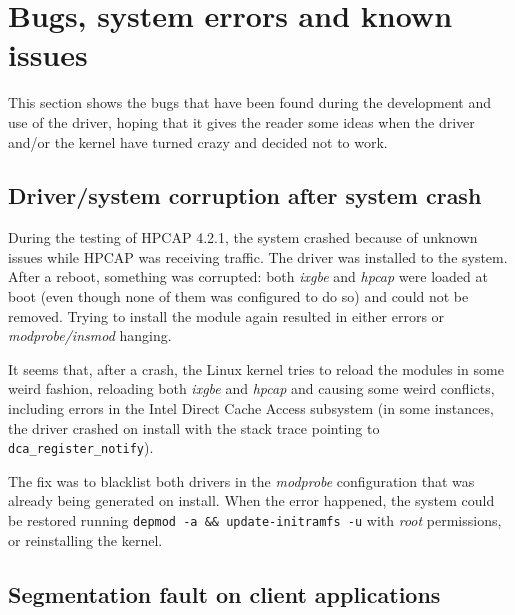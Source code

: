 \section{Bugs, system errors and known issues}
\label{sec:bugs}

This section shows the bugs that have been found during the development and use of the driver, hoping that it gives the reader some ideas when the driver and/or the kernel have turned crazy and decided not to work.

\subsection{Driver/system corruption after system crash}
\label{sec:bugs:drivercorrupt}

\begin{bugdata}
\end{bugdata}

During the testing of HPCAP 4.2.1, the system crashed because of unknown issues while HPCAP was receiving traffic. The driver was installed to the system. After a reboot, something was corrupted: both \textit{ixgbe} and \textit{hpcap} were loaded at boot (even though none of them was configured to do so) and could not be removed. Trying to install the module again resulted in either errors or \textit{modprobe/insmod} hanging.

It seems that, after a crash, the Linux kernel tries to reload the modules in some weird fashion, reloading both \textit{ixgbe} and \textit{hpcap} and causing some weird conflicts, including errors in the Intel Direct Cache Access subsystem (in some instances, the driver crashed on install with the stack trace pointing to \texttt{dca\_register\_notify}).


The fix was to blacklist both drivers in the \textit{modprobe} configuration that was already being generated on install. When the error happened, the system could be restored running \texttt{depmod -a \&\& update-initramfs -u} with \textit{root} permissions, or reinstalling the kernel.

\subsection{Segmentation fault on client applications}

